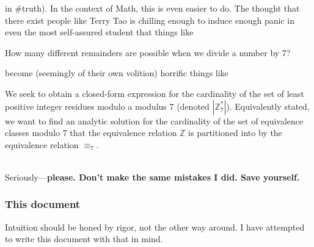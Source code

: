 \documentclass[10pt]{article}
\newcommand\ZZ{{\mathbb Z}}
\theoremstyle{definition}
\begin{document}
in \#truth).  In the context of Math, this is even easier to do.  The
thought that there exist people like Terry Tao is chilling enough to
induce enough panic in even the most self-assured student that things
like
\begin{center}
How many different remainders are possible when we divide a number by 7?
\end{center}
become (seemingly of their own volition) horrific things like \\
\begin{adjustwidth}{.05\linewidth}{}
We seek to obtain a closed-form expression for the cardinality of the
set of least positive integer residues modulo a modulus 7 (denoted
$|\ZZ_7^*|$).  Equivalently stated, we want to find an analytic
solution for the cardinality of the set of equivalence classes modulo
7 that the equivalence relation $\ZZ$ is partitioned into by the
equivalence relation $\equiv_7$.
\end{adjustwidth}~\\
Seriously---\textbf{please.  Don't make the same mistakes I did.  Save yourself.}
\subsubsection{This document}
Intuition should be honed by rigor, not the other way around.  I have
attempted to write this document with that in mind.
\end{document}
